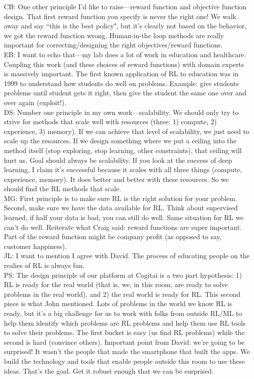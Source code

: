CB: One other principle I'd like to raise---reward function and objective function design. That first reward function you specify is never the right one! We walk away and say ``this is the best policy", but it's clearly not based on the behavior, we got the reward function wrong. Human-in-the loop methods are really important for correcting/designing the right objectives/reward functions. \\

EB: I want to echo that---my lab does a lot of work in education and healthcare. Coupling this work (and these choices of reward functions) with domain experts is massively important. The first known application of RL to education was in 1999 to understand how students do well on problems. Example: give students problems until student gets it right, then give the student the same one over and over again (exploit!). \\

DS: Number one principle in my own work---scalability. We should only try to strive for methods that scale well with resources (three: 1) compute, 2) experience, 3) memory). If we can achieve that level of scalability, we just need to scale up the resources. If we design something where we put a ceiling into the method itself (stop exploring, stop learning, other constraints), that ceiling will hurt us. Goal should always be scalability.  If you look at the success of deep learning, I claim it's successful because it scales with all three things (compute, experience, memory). It does better and better with these resources. So we should find the RL methods that scale. \\

MG: First principle is to make sure RL is the right solution for your problem. Second, make sure we have the data available for RL. Think about supervised learned, if half your data is bad, you can still do well. Same situation for RL we can't do well. Reiterate what Craig said: reward functions are super important. Part of the reward function might be company profit (as opposed to say, customer happiness). \\

JL: I want to mention I agree with David. The process of educating people on the realies of RL is always fun. \\

PS: The design principle of our platform at Cogitai is a two part hypothesis: 1) RL is ready for the real world (that is, we, in this room, are ready to solve problems in the real world), and 2) the real world is ready for RL. This second piece is what John mentioned. Lots of problems in the world we know RL is ready, but it's a big challenge for us to work with folks from outside RL/ML to help them identify which problems are RL problems and help them use RL tools to solve their problems. The first bucket is easy (us find RL problems) while the second is hard (convince others). Important point from David: we're going to be surprised! It wasn't the people that made the smartphone that built the apps. We build the technology and tools that enable people outside this room to use these ideas. That's the goal. Get it robust enough that we can be surprised. \\

